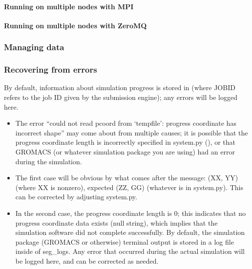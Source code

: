 \documentclass[letterpaper,10pt,english]{sphinxmanual}
\begin{document}
\paragraph{Running on multiple nodes with MPI}
\label{\detokenize{users_guide/west/running:running-on-multiple-nodes-with-mpi}}

\paragraph{Running on multiple nodes with ZeroMQ}
\label{\detokenize{users_guide/west/running:running-on-multiple-nodes-with-zeromq}}

\subsubsection{Managing data}
\label{\detokenize{users_guide/west/running:managing-data}}

\subsubsection{Recovering from errors}
\label{\detokenize{users_guide/west/running:recovering-from-errors}}
By default, information about simulation progress is stored in
 (where JOBID refers to the job ID given by the submission
engine); any errors will be logged here.
\begin{itemize}
\item {} 
The error “could not read pcoord from ‘tempfile’: progress coordinate has
incorrect shape” may come about from multiple causes; it is possible that the
progress coordinate length is incorrectly specified in system.py
(), or that GROMACS (or whatever simulation package you
are using) had an error during the simulation.

\item {} 
The first case will be obvious by what comes after the message: (XX, YY)
(where XX is non\sphinxhyphen{}zero), expected (ZZ, GG) (whatever is in system.py). This
can be corrected by adjusting system.py.

\item {} 
In the second case, the progress coordinate length is 0; this
indicates that no progress coordinate data exists (null string), which
implies that the simulation software did not complete successfully. By
default, the simulation package (GROMACS or otherwise) terminal output is
stored in a log file inside of seg\_logs. Any error that occurred during the
actual simulation will be logged here, and can be corrected as needed.

\end{itemize}
\end{document}
